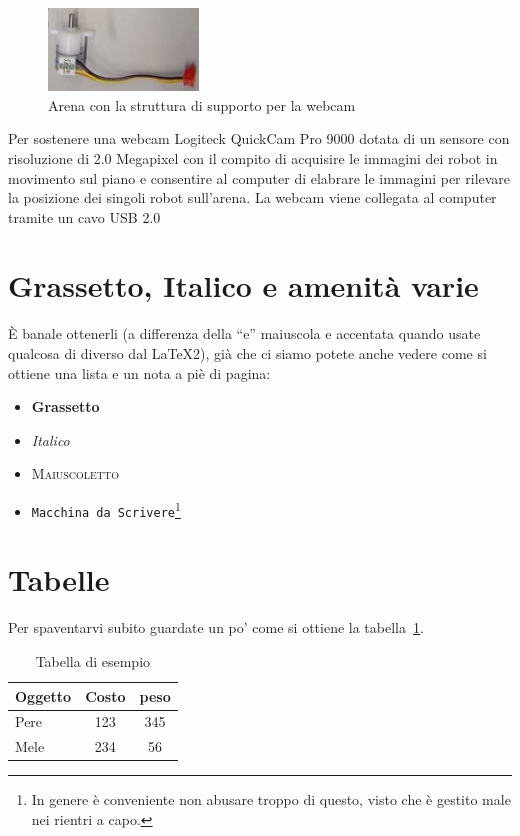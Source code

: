 	\begin{figure}[H]
	\centering
	\includegraphics[width=4cm]{images/motor+cable}
	\caption{Arena con la struttura di supporto per la webcam \label{arena}}
	\end{figure}
		
	Per sostenere una webcam Logiteck QuickCam Pro 9000 dotata di un sensore con risoluzione di 2.0 Megapixel con il compito di acquisire le immagini dei robot in movimento sul piano e consentire al computer di elabrare le immagini per rilevare la posizione dei singoli robot sull'arena.
	La webcam viene collegata al computer tramite un cavo USB 2.0 
	
	

\iffalse
	
\section{Grassetto, Italico e amenit\`a varie}
   \`E banale ottenerli (a differenza della ``e'' maiuscola e
   accentata quando usate qualcosa di diverso dal \LaTeX2),
   gi\`a che ci siamo potete anche vedere come si
   ottiene una lista e un nota a pi\`e di pagina:
   \begin{itemize}
   \item \textbf{Grassetto}
   \item \emph{Italico}
   \item \textsc{Maiuscoletto}
   \item \texttt{Macchina da Scrivere}\footnote{In genere \`e conveniente non
                 abusare troppo di questo, visto che \`e gestito male nei rientri a capo.}
   \end{itemize}
\section{Tabelle}

   Per spaventarvi subito guardate un po' come si ottiene la tabella~\ref{miatabella}.
   \begin{table}[h!]
    \centering
    \begin{tabular}{|l|c|c|}
    \hline
    Oggetto & Costo & peso \\
    \hline
    \hline
    Pere    & 123   & 345  \\
    \hline
    Mele    & 234   & 56   \\
    \hline
    \end{tabular}
    \caption{Tabella di esempio\label{miatabella}}
   \end{table}

